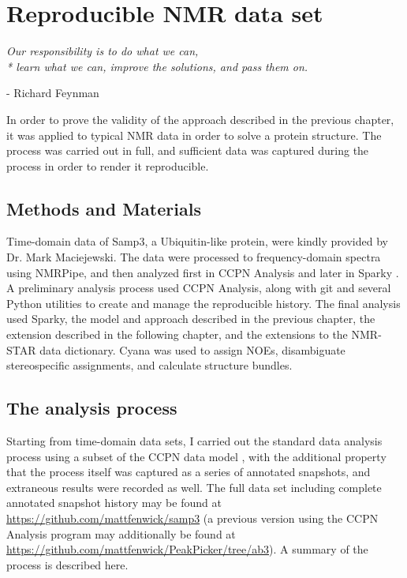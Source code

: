 \chapter{Reproducible NMR data set}

\begin{center}
  \textit{Our responsibility is to do what we can, \\* learn what we can, 
    improve the solutions, and pass them on.}

 - Richard Feynman
\end{center}


In order to prove the validity of the approach described in the previous
chapter, it was applied to typical NMR data in order to solve a protein
structure.  The process was carried out in full, and sufficient data was
captured during the process in order to render it reproducible.


\section{Methods and Materials}

Time-domain data of Samp3, a Ubiquitin-like protein, were kindly provided by 
Dr. Mark Maciejewski.  The data were processed to frequency-domain spectra
using NMRPipe, and then analyzed first in CCPN Analysis \cite{ccpn} and later 
in Sparky \cite{sparky}.  A preliminary analysis process used CCPN Analysis,
along with git and several Python utilities to create and manage the 
reproducible history.  The final analysis used Sparky, the model and approach
described in the previous chapter, the extension described in the following
chapter, and the extensions to the NMR-STAR data dictionary.  
Cyana was used to assign NOEs,
disambiguate stereospecific assignments, and calculate structure bundles.


\section{The analysis process}
Starting from time-domain data sets, I carried out the standard data analysis
process using a subset of the CCPN data model \cite{ccpn}, 
with the additional property that the process itself was captured as
a series of annotated snapshots, and extraneous results were recorded as well.
The full data set including complete annotated snapshot history may be found at 
\url{https://github.com/mattfenwick/samp3}
(a previous version using the CCPN Analysis program may additionally be found
at \url{https://github.com/mattfenwick/PeakPicker/tree/ab3}).
A summary of the process is described here.

